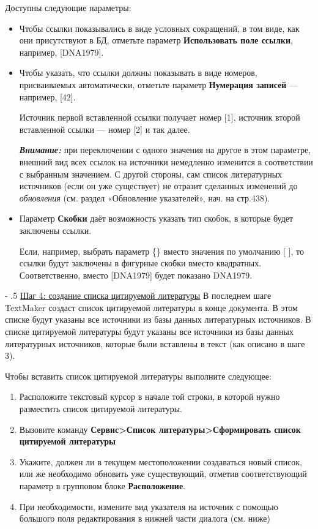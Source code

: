 ﻿\documentclass[a4paper,10pt]{article}
\makeatletter
\renewcommand\paragraph{%
   \@startsection{paragraph}{4}{0mm}%
      {-\baselineskip}%
      {.5\baselineskip}%
      {\normalfont\normalsize\bfseries}}
\makeatother
\begin{document}
Доступны следующие параметры:
\begin{itemize}
 \item Чтобы ссылки показывались в виде условных сокращений, в том виде, как они присутствуют в БД, отметьте параметр \textbf{Использовать поле ссылки}, например, [DNA1979].
 \item Чтобы указать, что ссылки должны показывать в виде номеров, присваиваемых автоматически, отметьте параметр \textbf{Нумерация записей} — например, [42].
 
 Источник первой вставленной ссылки получает номер [1], источник второй вставленной ссылки — номер [2] и так далее.
 
 \begin{mdframed}[backgroundcolor=blue!10]
\textbf{\textit{Внимание:}} при переключении с одного значения на другое в этом параметре, внешний вид всех ссылок на источники немедленно изменится в соответствии с выбранным значением.  С другой стороны, сам список литературных источников (если он уже существует) не отразит сделанных изменений до \textit{обновления} (см. раздел «Обновление указателей»,  нач. на стр.438).
\end{mdframed}
\item Параметр \textbf{Скобки} даёт возможность указать тип скобок, в которые будет заключены ссылки.

Если, например, выбрать параметр \{\} вместо значения по умолчанию [ ], то ссылки будут заключены в фигурные скобки вместо квадратных. Соответственно, вместо [DNA1979] будет показано {DNA1979}.
\end{itemize}

\paragraph{\underline{Шаг 4: создание списка цитируемой литературы}}
В последнем шаге TextMaker создаст список цитируемой литературы в конце документа. В этом списке будут указаны все источники из базы данных литературных источников. В списке цитируемой литературы будут указаны все источники из базы данных литературных источников, которые были вставлены в текст (как описано в шаге 3).

Чтобы вставить список цитируемой литературы выполните следующее:
\begin{enumerate}
 \item Расположите текстовый курсор в начале той строки, в которой нужно разместить список цитируемой литературы.
 \item Вызовите команду \textbf{Сервис>Список литературы>Сформировать список цитируемой литературы}
 \item Укажите, должен ли в текущем местоположении создаваться новый список, или же необходимо обновить уже существующий, отметив соответствующий параметр в групповом блоке \textbf{Расположение}.
 \item При необходимости, измените вид указателя на источник с помощью большого поля редактирования в нижней части диалога (см. ниже)
\end{enumerate}
\end{document}
